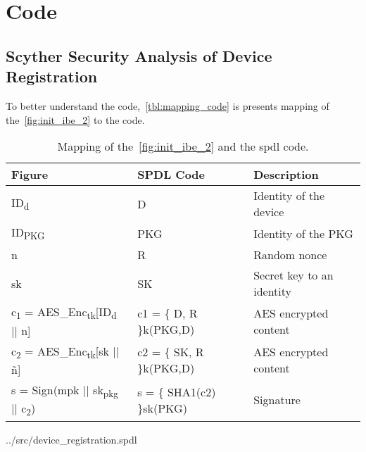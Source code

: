 \chapter{Code}\label{apx:code}


\section{Scyther Security Analysis of Device Registration}\label{apx:scyther-analysis-dr}
To better understand the code,~\autoref{tbl:mapping_code} is presents mapping of the~\autoref{fig:init_ibe_2} to the code.

\begin{table}[h]
  \begin{tabular}{lll}
  Figure      				& SPDL Code     			& Description 				\\ \hline
  ID\textsubscript{d}  		& D   						& Identity of the device 	\\ %
  ID\textsubscript{PKG}   	& PKG      					& Identity of the PKG 		\\ %
  n      					& R            				& Random nonce 				\\ %
  sk      					& SK           				& Secret key to an identity	\\ %
  c\textsubscript{1} = AES\_Enc\textsubscript{tk}[ID\textsubscript{d} || n]  & c1 = \{ D, R \}k(PKG,D)   & AES encrypted content		\\ %
  c\textsubscript{2} = AES\_Enc\textsubscript{tk}[sk || \~{n}]     	& c2 = \{ SK, R \}k(PKG,D)	& AES encrypted content 	\\ %
  s = Sign(mpk || sk\textsubscript{pkg} || c\textsubscript{2})      & s = \{ SHA1(c2) \}sk(PKG)   & Signature				\\ %
  \end{tabular}
  \caption{Mapping of the~\autoref{fig:init_ibe_2} and the \gls{spdl} code.}
  \label{tbl:mapping_code}
\end{table}

\begin{lstinputlisting}
[language=Python]{../src/device_registration.spdl}
\end{lstinputlisting}

